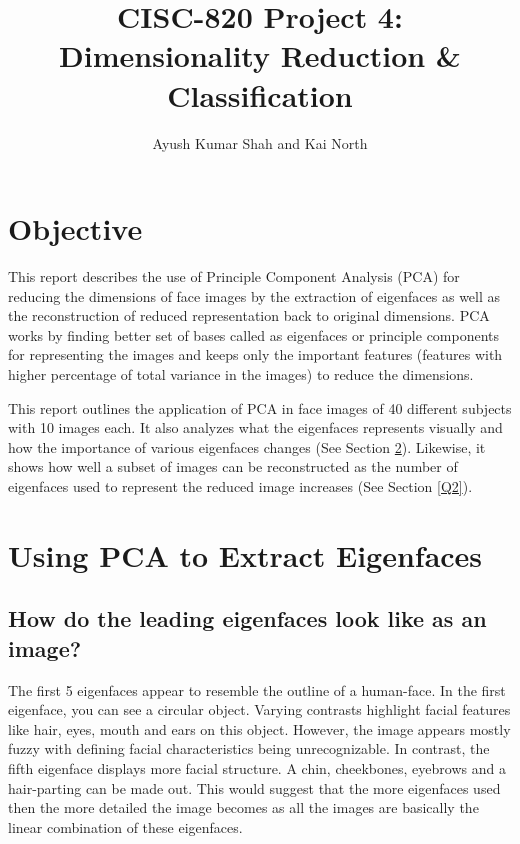 \documentclass[letterpaper,12pt]{article}
\begin{document}
\title{{\myfont CISC-820 Project 4: Dimensionality Reduction \& Classification}}

\author{\myfont Ayush Kumar Shah and Kai North}
\date{}
\maketitle

\section{Objective}\label{intro}

This report describes the use of Principle Component Analysis (PCA) for reducing the dimensions of face images by the extraction of eigenfaces as well as the reconstruction of reduced representation back to original dimensions. PCA works by finding better set of bases called as eigenfaces or principle components for representing the images and keeps only the important features (features with higher percentage of total variance in the images) to reduce the dimensions.

This report outlines the application of PCA in face images of 40 different subjects with 10 images each. It also analyzes what the eigenfaces represents visually and how the importance of various eigenfaces changes (See Section \ref{Q1}). Likewise, it shows how well a subset of images can be reconstructed as the number of eigenfaces used to represent the reduced image increases (See Section \ref{Q2}).

\section{Using PCA to Extract Eigenfaces}\label{Q1}


\subsection{How do the leading eigenfaces look like as an image?}\label{Q1.1}

The first 5 eigenfaces appear to resemble the outline of a human-face. In the first eigenface, you can see a circular object. Varying contrasts highlight facial features like hair, eyes, mouth and ears on this object. However, the image appears mostly fuzzy with defining facial characteristics being unrecognizable. In contrast, the fifth eigenface displays more facial structure. A chin, cheekbones, eyebrows and a hair-parting can be made out. This would suggest that the more eigenfaces used then the more detailed the image becomes as all the images are basically the linear combination of these eigenfaces.
\end{document}
